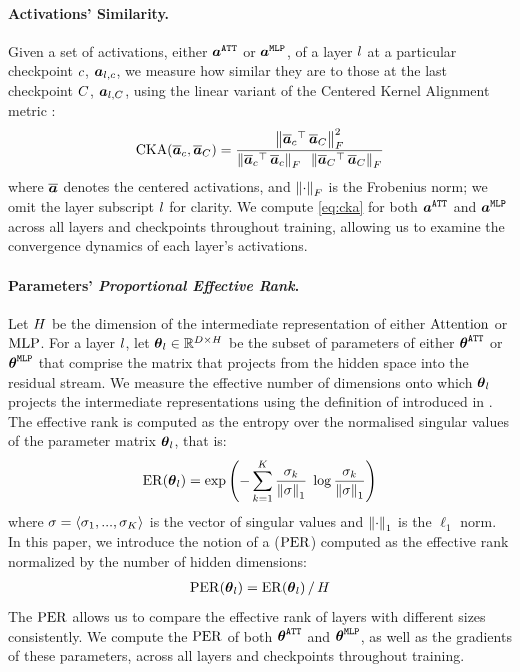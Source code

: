 \paragraph{Activations' Similarity.}
Given a set of activations, either $\boldsymbol{a}^{\mathtt{ATT}}$ or $\boldsymbol{a}^{\mathtt{MLP}}$, of a layer $l$ at a particular checkpoint $c$, $\boldsymbol{a}_{l, c}$, we measure how similar they are to those at the last checkpoint $C$, $\boldsymbol{a}_{l, C}$, using the linear variant of the Centered Kernel Alignment metric \citep[$\cka$;][]{kornblith2019cka}:
\begin{align}\label{eq:cka}
    \mathrm{CKA}(\overline{\boldsymbol{a}}_{c}, \overline{\boldsymbol{a}}_{C}) = \frac{\left\lVert\overline{\boldsymbol{a}}_{c}{}^{\top}\, \overline{\boldsymbol{a}}_{C}\right\rVert^2_F}{\left\lVert\overline{\boldsymbol{a}}_{c}{}^{\top}\,\overline{\boldsymbol{a}}_{c}\right\rVert_F\; \;\left\lVert\overline{\boldsymbol{a}}_{C}{}^{\top}\,\overline{\boldsymbol{a}}_{C}\right\rVert_F}
\end{align}
where $\overline{\boldsymbol{a}}$ denotes the centered activations, and $\left\lVert\cdot\right\rVert_F$ is the Frobenius norm; we omit the layer subscript $l$ for clarity.
We compute \cref{eq:cka} for both $\boldsymbol{a}^{\mathtt{ATT}}$ and $\boldsymbol{a}^{\mathtt{MLP}}$ across all layers and checkpoints throughout training, allowing us to examine the convergence dynamics of each layer's activations.

\paragraph{Parameters' \textit{Proportional Effective Rank}.}
Let $H$ be the dimension of the intermediate representation of either $\mathrm{Attention}$ or $\mathrm{MLP}$. For a layer $l$, let $\boldsymbol{\theta}_{l} \in \mathbb{R}^{\mathop{D\times H}}$ be the subset of parameters of either $\boldsymbol{\theta}^{\mathtt{ATT}}$ or $\boldsymbol{\theta}^{\mathtt{MLP}}$ that comprise the matrix that projects from the hidden space into the residual stream.
We measure the effective number of dimensions onto which $\boldsymbol{\theta}_{l}$ projects the intermediate representations using the definition of   introduced in \citet{roy2007effectiverank}. The effective rank is computed as the entropy over the normalised singular values of the parameter matrix $\boldsymbol{\theta}_{l}$, that is:
\begin{align}\label{eq:per}
    \mathrm{ER}(\boldsymbol{\theta}_{l}) = \exp \left( -\sum_{k=1}^K \frac{\sigma_k}{\left\lVert\sigma\right\rVert_1} \; \log \frac{\sigma_k}{\left\lVert\sigma\right\rVert_1}\right)
\end{align}
where $\sigma = \langle\sigma_1, ..., \sigma_K\rangle$ is the vector of singular values and $\left\lVert\cdot\right\rVert_1$ is the $\ell_1$ norm.
In this paper, we introduce the notion of a  ($\mathrm{PER}$) computed as the effective rank normalized by the number of hidden dimensions: 
\begin{align}
    \mathrm{PER}(\boldsymbol{\theta}_{l}) = \mathrm{ER}(\boldsymbol{\theta}_{l}) \, / \, H
\end{align}
The $\mathrm{PER}$ allows us to compare the effective rank of layers with different sizes consistently. We compute the $\mathrm{PER}$ of both $\boldsymbol{\theta}^{\mathtt{ATT}}$ and $\boldsymbol{\theta}^{\mathtt{MLP}}$, as well as the gradients of these parameters, across all layers and checkpoints throughout training. 

